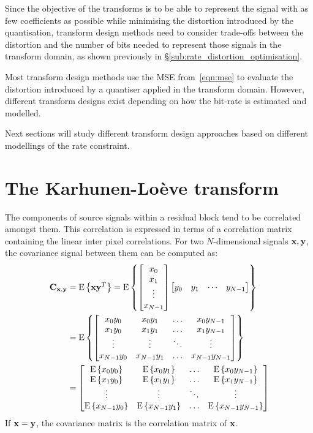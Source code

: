 \documentclass[11pt,a4paper,openright,twoside]{book}
\numberwithin{equation}{section} %
\numberwithin{figure}{section} %
\numberwithin{table}{section} %
\begin{document}
Since the objective of the transforms is to be able to represent the signal
with as few coefficients as possible while minimising the distortion
introduced by the quantisation, transform design methods need to consider
trade-offs between the distortion and the number of bits needed to represent
those signals in the transform domain, as shown previously in
\S\ref{sub:rate_distortion_optimisation}.

Most transform design methods use the \ac{MSE} from~\eqref{eqn:mse} to
evaluate the distortion introduced by a quantiser applied in the transform
domain.
However, different transform designs exist depending on how the bit-rate is
estimated and modelled.

Next sections will study different transform design approaches based on
different modellings of the rate constraint.
\section{The Karhunen-Loève transform}
\label{sec:the_karhunen_loeve_transform}
The components of source signals within a residual block tend to be correlated
amongst them.
This correlation is expressed in terms of a correlation matrix containing the
linear inter pixel correlations.
For two $N$-dimensional signals $\mathbf{x},\mathbf{y}$, the covariance signal between them
can be computed as:
\begin{align}
	\nonumber
	\mathbf{C}_{\mathbf{x},\mathbf{y}} & = \text{E}\left\{\mathbf{x}\mathbf{y}^T\right\} =
	\text{E}\left\{
	\begin{bmatrix}
		x_0 \\ x_1 \\ \vdots \\ x_{N-1}
	\end{bmatrix}
	\begin{bmatrix}
		y_0 & y_1 & \cdots & y_{N-1}
	\end{bmatrix}
	\right\} \\
	& = \text{E}\left\{
	\begin{bmatrix}
		x_0y_0 & x_0y_1 & \hdots & x_{0}y_{N-1} \\
		x_1y_0 & x_1y_1 & \hdots & x_{1}y_{N-1} \\
		\vdots & \vdots & \ddots & \vdots \\
		x_{N-1}y_0 & x_{N-1}y_1 & \hdots & x_{N-1}y_{N-1}
	\end{bmatrix}
	\right\} \\ \nonumber
	& =
	\begin{bmatrix}
		\text{E}\left\{x_0y_0\right\} & \text{E}\left\{x_0y_1\right\} & \hdots & \text{E}\left\{x_{0}y_{N-1}\right\} \\
		\text{E}\left\{x_1y_0\right\} & \text{E}\left\{x_1y_1\right\} & \hdots & \text{E}\left\{x_{1}y_{N-1}\right\} \\
		\vdots & \vdots & \ddots & \vdots \\
		\text{E}\left\{x_{N-1}y_0\right\} & \text{E}\left\{x_{N-1}y_1\right\} & \hdots & \text{E}\left\{x_{N-1}y_{N-1}\right\}
	\end{bmatrix}
\end{align}
If $\mathbf{x}=\mathbf{y}$, the covariance matrix is the correlation matrix of $\mathbf{x}$.
\end{document}

